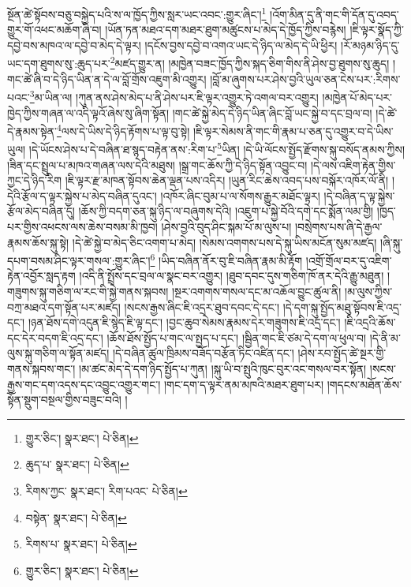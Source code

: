 སྔོན་ཚེ་སྟོབས་བཅུ་བསྐྱེད་པའི་ས་ལ་ཁྱོད་ཀྱིས་སླར་ཡང་འབང་:གྱུར་ཞིང་།\footnote{གྱུར་ཅིང་།  སྣར་ཐང་།  པེ་ཅིན། } །འོག་མིན་དུ་ནི་གང་གི་དོན་དུ་འབད་གྱུར་གོ་འཕང་མཆོག་ཞི་བ། །ཡོན་ཏན་མཐའ་དག་མཐར་ཐུག་མཚུངས་པ་མེད་དེ་ཁྱོད་ཀྱིས་བརྙེས། །ཇི་ལྟར་སྣོད་ཀྱི་དབྱེ་བས་མཁའ་ལ་དབྱེ་བ་མེད་དེ་ལྟར། །དངོས་བྱས་དབྱེ་བ་འགའ་ཡང་དེ་ཉིད་ལ་མེད་དེ་ཡི་ཕྱིར། །རོ་མཉམ་ཉིད་དུ་ཡང་དག་ཐུགས་སུ་:ཆུད་པར་\footnote{ཆུད་པ་  སྣར་ཐང་།  པེ་ཅིན། }མཛད་གྱུར་ན། །མཁྱེན་བཟང་ཁྱོད་ཀྱིས་སྐད་ཅིག་གིས་ནི་ཤེས་བྱ་ཐུགས་སུ་ཆུད། །གང་ཚེ་ཞི་བ་དེ་ཉིད་ཡིན་ན་དེ་ལ་བློ་གྲོས་འཇུག་མི་འགྱུར། །བློ་མ་ཞུགས་པར་ཤེས་བྱའི་ཡུལ་ཅན་ངེས་པར་:རིགས་པའང་\footnote{རིགས་ཀྱང་  སྣར་ཐང་། རིག་པའང་  པེ་ཅིན། }མ་ཡིན་ལ། །ཀུན་ནས་ཤེས་མེད་པ་ནི་ཤེས་པར་ཇི་ལྟར་འགྱུར་ཏེ་འགལ་བར་འགྱུར། །མཁྱེན་པོ་མེད་པར་ཁྱེད་ཀྱིས་གཞན་ལ་འདི་ལྟའོ་ཞེས་སུ་ཞིག་སྟོན། །གང་ཚེ་སྐྱེ་མེད་དེ་ཉིད་ཡིན་ཞིང་བློ་ཡང་སྐྱེ་བ་དང་བྲལ་བ། །དེ་ཚེ་དེ་རྣམས་སྟེན་\footnote{བསྟེན་  སྣར་ཐང་།  པེ་ཅིན། }ལས་དེ་ཡིས་དེ་ཉིད་རྟོགས་པ་ལྟ་བུ་སྟེ། །ཇི་ལྟར་སེམས་ནི་གང་གི་རྣམ་པ་ཅན་དུ་འགྱུར་བ་དེ་ཡིས་ཡུལ། །དེ་ཡོངས་ཤེས་པ་དེ་བཞིན་ཐ་སྙད་བརྟེན་ནས་:རིག་པ་\footnote{རིགས་པ་  སྣར་ཐང་།  པེ་ཅིན། }ཡིན། །དེ་ཡི་ལོངས་སྤྱོད་རྫོགས་སྐུ་བསོད་ནམས་ཀྱིས། །ཟིན་དང་སྤྲུལ་པ་མཁའ་གཞན་ལས་དེའི་མཐུས། །སྒྲ་གང་ཆོས་ཀྱི་དེ་ཉིད་སྟོན་འབྱུང་བ། །དེ་ལས་འཇིག་རྟེན་གྱིས་ཀྱང་དེ་ཉིད་རིག །ཇི་ལྟར་རྫ་མཁན་སྟོབས་ཆེན་ལྡན་པས་འདིར། །ཡུན་རིང་ཆེས་འབད་པས་བསྐོར་འཁོར་ལོ་ནི། །དེའི་རྩོལ་ད་ལྟར་སྐྱེས་པ་མེད་བཞིན་དུའང་། །འཁོར་ཞིང་བུམ་པ་ལ་སོགས་རྒྱུར་མཐོང་ལྟར། །དེ་བཞིན་ད་ལྟ་སྐྱེས་རྩོལ་མེད་བཞིན་དུ། །ཆོས་ཀྱི་བདག་ཅན་སྐུ་ཉིད་ལ་བཞུགས་དེའི། །འཇུག་པ་སྐྱེ་བོའི་དགེ་དང་སྨོན་ལམ་གྱི། །ཁྱད་པར་གྱིས་འཕངས་ལས་ཆེས་བསམ་མི་ཁྱབ། །ཤེས་བྱའི་བུད་ཤིང་སྐམ་པོ་མ་ལུས་པ། །བསྲེགས་པས་ཞི་དེ་རྒྱལ་རྣམས་ཆོས་སྐུ་སྟེ། །དེ་ཚེ་སྐྱེ་བ་མེད་ཅིང་འགག་པ་མེད། །སེམས་འགགས་པས་དེ་སྐུ་ཡིས་མངོན་སུམ་མཛད། །ཞི་སྐུ་དཔག་བསམ་ཤིང་ལྟར་གསལ་:གྱུར་ཞིང་།\footnote{གྱུར་ཅིང་།  སྣར་ཐང་།  པེ་ཅིན། } །ཡིད་བཞིན་ནོར་བུ་ཇི་བཞིན་རྣམ་མི་རྟོག །འགྲོ་གྲོལ་བར་དུ་འཇིག་རྟེན་འབྱོར་སླད་རྟག །འདི་ནི་སྤྲོས་དང་བྲལ་ལ་སྣང་བར་འགྱུར། །ཐུབ་དབང་དུས་གཅིག་ཁོ་ནར་དེའི་རྒྱུ་མཐུན། །གཟུགས་སྐུ་གཅིག་ལ་རང་གི་སྐྱེ་གནས་སྐབས། །སྔར་འགགས་གསལ་དང་མ་འཆོལ་བྱུང་ཚུལ་ནི། །མ་ལུས་ཀྱིས་བཀྲ་མཐའ་དག་སྟོན་པར་མཛད། །སངས་རྒྱས་ཞིང་ཇི་འདྲར་ཐུབ་དབང་དེ་དང་། །དེ་དག་སྐུ་སྤྱོད་མཐུ་སྟོབས་ཇི་འདྲ་དང་། །ཉན་ཐོས་དགེ་འདུན་ཇི་སྙེད་ཇི་ལྟ་དང་། །བྱང་ཆུབ་སེམས་རྣམས་དེར་གཟུགས་ཇི་འདྲ་དང་། །ཇི་འདྲའི་ཆོས་དང་དེར་བདག་ཇི་འདྲ་དང་། །ཆོས་ཐོས་སྤྱོད་པ་གང་ལ་སྤྱད་པ་དང་། །སྦྱིན་གང་ཇི་ཙམ་དེ་དག་ལ་ཕུལ་བ། །དེ་ནི་མ་ལུས་སྐུ་གཅིག་ལ་སྟོན་མཛད། །དེ་བཞིན་ཚུལ་ཁྲིམས་བཟོད་བརྩོན་ཏིང་འཛིན་དང་། །ཤེས་རབ་སྤྱོད་ཚེ་སྔར་གྱི་གནས་སྐབས་གང་། །མ་ཚང་མེད་དེ་དག་ཉིད་སྤྱོད་པ་ཀུན། །སྐུ་ཡི་བ་སྤུའི་ཁུང་བུར་འང་གསལ་བར་སྟོན། །སངས་རྒྱས་གང་དག་འདས་དང་འབྱུང་འགྱུར་གང་། །གང་དག་ད་ལྟར་ནམ་མཁའི་མཐར་ཐུག་པར། །གདངས་མཐོན་ཆོས་སྟོན་སྡུག་བསྔལ་གྱིས་བཟུང་བའི། །
